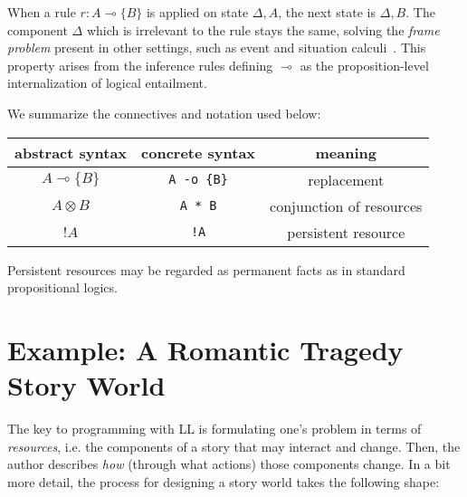 \documentclass[letterpaper]{article}
\newcommand{\lolli}{\multimap}
\newcommand{\tensor}{\otimes}
\newcommand{\bang}{!}
\newcommand{\mon}[1]{\{#1\}}
\begin{document}
When a rule $r : A \lolli \mon{B}$ is applied on state $\Delta, A$, the
next state is $\Delta, B$. The component $\Delta$ which is irrelevant to
the rule stays the same, solving the {\em frame problem} present in other
settings, such as event and situation calculi~\cite{hayes1971frame}. This
property arises from the inference rules defining $\lolli$ as the
proposition-level internalization of logical entailment.

We summarize the connectives and notation used below:

\begin{tabular}{ccc}
abstract syntax & concrete syntax & meaning\\
\hline
$A \lolli \mon{B}$    & \verb|A -o {B}|  & replacement \\
$A \tensor B$   & \verb|A * B|   & conjunction of resources\\
$\bang A$       & \verb|!A|      & persistent resource\\
\end{tabular}

Persistent resources may be regarded as permanent facts as in standard
propositional logics.

\section{Example: A Romantic Tragedy Story World}

The key to programming with LL is formulating one's problem in
terms of {\em resources}, i.e. the components of a story that may interact
and change. Then, the author describes {\em how} (through what actions)
those components change. In a bit more detail, the process for designing a
story world takes the following shape:
\end{document}
